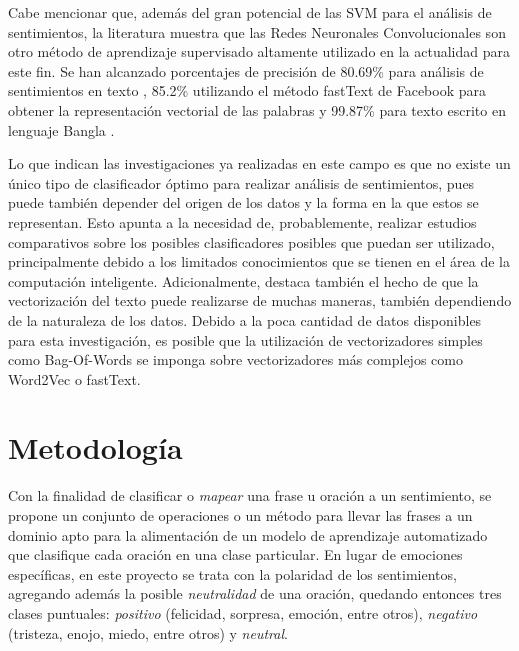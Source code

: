 \documentclass[conference]{IEEEtran}
\begin{document}
    Cabe mencionar que, además del gran potencial de las SVM para el análisis de sentimientos, la literatura muestra que las Redes Neuronales Convolucionales son otro método de aprendizaje supervisado altamente utilizado en la actualidad para este fin. Se han alcanzado porcentajes de precisión de 80.69\% para análisis de sentimientos en texto \cite{chachra2017sentiment}, 85.2\% utilizando el método fastText de Facebook para obtener la representación vectorial de las palabras \cite{santos2017sentiment} y 99.87\% para texto escrito en lenguaje Bangla \cite{alam2017sentiment}.
    
    Lo que indican las investigaciones ya realizadas en este campo es que no existe un único tipo de clasificador óptimo para realizar análisis de sentimientos, pues puede también depender del origen de los datos y la forma en la que estos se representan. Esto apunta a la necesidad de, probablemente, realizar estudios comparativos sobre los posibles clasificadores posibles que puedan ser utilizado, principalmente debido a los limitados conocimientos que se tienen en el área de la computación inteligente. Adicionalmente, destaca también el hecho de que la vectorización del texto puede realizarse de muchas maneras, también dependiendo de la naturaleza de los datos. Debido a la poca cantidad de datos disponibles para esta investigación, es posible que la utilización de vectorizadores simples como Bag-Of-Words se imponga sobre vectorizadores más complejos como Word2Vec o fastText.
    



\section{Metodología} \label{sec:metodologia}

    Con la finalidad de clasificar o \textit{mapear} una frase u oración a un sentimiento, se propone un conjunto de operaciones o un método para llevar las frases a un dominio apto para la alimentación de un modelo de aprendizaje automatizado que clasifique cada oración en una clase particular. En lugar de emociones específicas, en este proyecto se trata con la polaridad de los sentimientos, agregando además la posible \textit{neutralidad} de una oración, quedando entonces tres clases puntuales: \textit{positivo} (felicidad, sorpresa, emoción, entre otros), \textit{negativo} (tristeza, enojo, miedo, entre otros) y \textit{neutral}.
\end{document}
